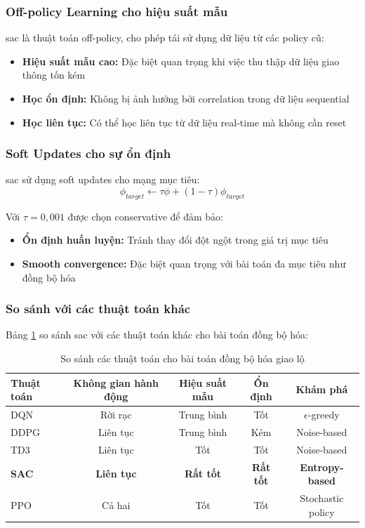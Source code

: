 \subsubsection{Off-policy Learning cho hiệu suất mẫu}
\ac{sac} là thuật toán off-policy, cho phép tái sử dụng dữ liệu từ các policy cũ:
\begin{itemize}
    \item \textbf{Hiệu suất mẫu cao:} Đặc biệt quan trọng khi việc thu thập dữ liệu giao thông tốn kém
    \item \textbf{Học ổn định:} Không bị ảnh hưởng bởi correlation trong dữ liệu sequential
    \item \textbf{Học liên tục:} Có thể học liên tục từ dữ liệu real-time mà không cần reset
\end{itemize}

\subsubsection{Soft Updates cho sự ổn định}
\ac{sac} sử dụng soft updates cho mạng mục tiêu:
\begin{equation}
    \phi_{target} \leftarrow \tau \phi + (1-\tau) \phi_{target}
\end{equation}

Với $\tau = 0,001$ được chọn conservative để đảm bảo:
\begin{itemize}
    \item \textbf{Ổn định huấn luyện:} Tránh thay đổi đột ngột trong giá trị mục tiêu
    \item \textbf{Smooth convergence:} Đặc biệt quan trọng với bài toán đa mục tiêu như đồng bộ hóa
\end{itemize}

\subsubsection{So sánh với các thuật toán khác}
Bảng \ref{tab:algorithm_comparison} so sánh \ac{sac} với các thuật toán khác cho bài toán đồng bộ hóa:

\begin{table}[!htp]
\centering
\caption{So sánh các thuật toán cho bài toán đồng bộ hóa giao lộ}
\label{tab:algorithm_comparison}
\begin{tabular}{|l|c|c|c|c|}
\hline
\textbf{Thuật toán} & \textbf{Không gian hành động} & \textbf{Hiệu suất mẫu} & \textbf{Ổn định} & \textbf{Khám phá} \\
\hline
DQN & Rời rạc & Trung bình & Tốt & $\epsilon$-greedy \\
\hline
DDPG & Liên tục & Trung bình & Kém & Noise-based \\
\hline
TD3 & Liên tục & Tốt & Tốt & Noise-based \\
\hline
\textbf{SAC} & \textbf{Liên tục} & \textbf{Rất tốt} & \textbf{Rất tốt} & \textbf{Entropy-based} \\
\hline
PPO & Cả hai & Tốt & Tốt & Stochastic policy \\
\hline
\end{tabular}
\end{table}

